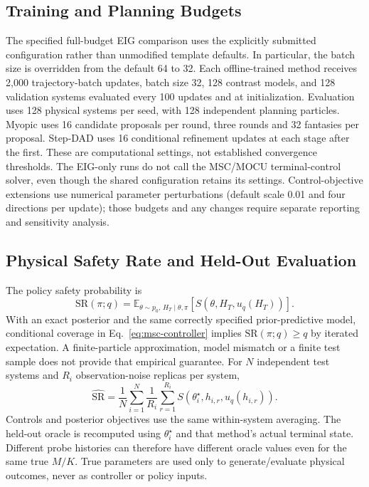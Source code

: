 \documentclass[journal]{IEEEtran}
\newcommand{\E}{\mathbb{E}}
\begin{document}
\subsection{Training and Planning Budgets}
The specified full-budget EIG comparison uses the explicitly submitted
configuration rather than unmodified template defaults. In particular, the
batch size is overridden from the default 64 to 32. Each offline-trained
method receives 2,000 trajectory-batch updates,
batch size 32, 128 contrast models, and 128 validation systems evaluated every
100 updates and at initialization. Evaluation uses 128 physical systems per
seed, with 128 independent planning particles. Myopic uses 16 candidate
proposals per round, three rounds and 32 fantasies per proposal. Step-DAD uses
16 conditional refinement updates at each stage after the first. These are
computational settings, not established convergence thresholds. The EIG-only
runs do not call the MSC/MOCU terminal-control solver, even though the shared
configuration retains its settings. Control-objective extensions use numerical
parameter perturbations (default scale 0.01 and four directions per update);
those budgets and any changes require separate reporting and sensitivity
analysis.

\subsection{Physical Safety Rate and Held-Out Evaluation}
The policy safety probability is
\begin{equation}
\mathrm{SR}(\pi;q)=\E_{\theta\sim p_0,\,H_T\mid\theta,\pi}
[S(\theta,H_T,u_q(H_T))].
\label{eq:safety-rate}
\end{equation}
With an exact posterior and the same correctly specified prior-predictive
model, conditional coverage in Eq.~\eqref{eq:msc-controller} implies
$\mathrm{SR}(\pi;q)\ge q$ by iterated expectation. A finite-particle
approximation, model mismatch or a finite test sample does not provide that
empirical guarantee.
For $N$ independent test systems and $R_i$ observation-noise replicas per system,
\begin{equation}
\widehat{\mathrm{SR}}=\frac1N\sum_{i=1}^N\frac1{R_i}
\sum_{r=1}^{R_i}S(\theta_i^\star,h_{i,r},u_q(h_{i,r})).
\label{eq:empirical-safety}
\end{equation}
Controls and posterior objectives use the same within-system averaging.
The held-out oracle is recomputed using $\theta_i^\star$ and that method's
actual terminal state. Different probe histories can therefore have different
oracle values even for the same true $M/K$. True parameters are used only
to generate/evaluate physical outcomes, never as controller or policy inputs.
\end{document}
